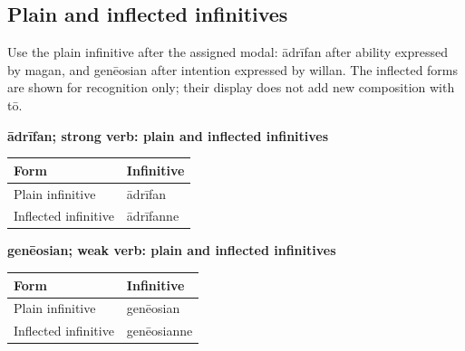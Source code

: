 \subsection*{Plain and inflected infinitives}

Use the plain infinitive after the assigned modal: ādrīfan after ability expressed by magan, and genēosian after intention expressed by willan. The inflected forms are shown for recognition only; their display does not add new composition with tō.

\textbf{ādrīfan; strong verb: plain and inflected infinitives}

\par\begingroup
\fontsize{10.5}{13.2}\selectfont
\setlength{\LTleft}{0pt}\setlength{\LTright}{\fill}
\noindent
\begin{tabular}{@{}>{\raggedright\arraybackslash}p{71.72mm}>{\raggedright\arraybackslash}p{49.46mm}@{}}
\toprule
\textbf{Form} & \textbf{Infinitive} \\
\midrule
Plain infinitive & ādrīfan \\
Inflected infinitive & ādrīfanne \\
\bottomrule
\end{tabular}
\par\endgroup

\textbf{genēosian; weak verb: plain and inflected infinitives}

\par\begingroup
\fontsize{10.5}{13.2}\selectfont
\setlength{\LTleft}{0pt}\setlength{\LTright}{\fill}
\noindent
\begin{tabular}{@{}>{\raggedright\arraybackslash}p{68.91mm}>{\raggedright\arraybackslash}p{52.28mm}@{}}
\toprule
\textbf{Form} & \textbf{Infinitive} \\
\midrule
Plain infinitive & genēosian \\
Inflected infinitive & genēosianne \\
\bottomrule
\end{tabular}
\par\endgroup

